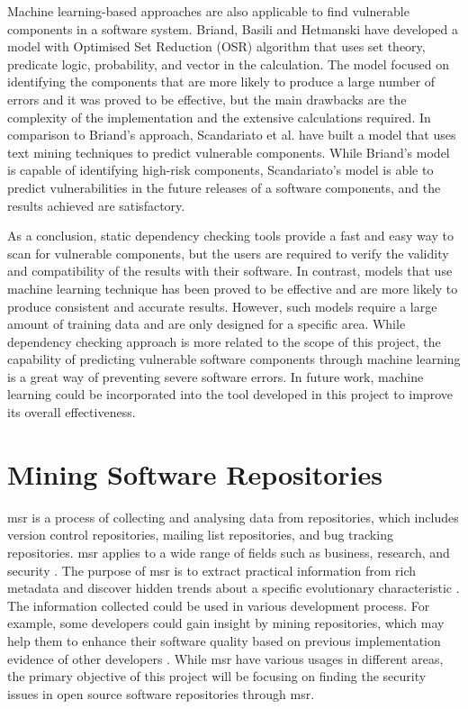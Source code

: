 \documentclass[12pt, a4paper]{report}
\begin{document}
Machine learning-based approaches are also applicable to find vulnerable components in a software
system. Briand, Basili and Hetmanski \cite{briand_1993} have developed a model with Optimised Set
Reduction (OSR) algorithm that uses set theory, predicate logic, probability, and vector in the
calculation. The model focused on identifying the components that are more likely to produce a large
number of errors and it was proved to be effective, but the main drawbacks are the complexity of the
implementation and the extensive calculations required. In comparison to Briand's approach,
Scandariato et al. \cite{scandariato_2014} have built a model that uses text mining techniques to
predict vulnerable components. While Briand's model is capable of identifying high-risk components,
Scandariato's model is able to predict vulnerabilities in the future releases of a software
components, and the results achieved are satisfactory.

As a conclusion, static dependency checking tools provide a fast and easy way to scan for vulnerable
components, but the users are required to verify the validity and compatibility of the results with
their software. In contrast, models that use machine learning technique has been proved to be
effective and are more likely to produce consistent and accurate results. However, such models
require a large amount of training data and are only designed for a specific area. While dependency
checking approach is more related to the scope of this project, the capability of predicting
vulnerable software components through machine learning is a great way of preventing severe software
errors. In future work, machine learning could be incorporated into the tool developed in this
project to improve its overall effectiveness.

\section{Mining Software Repositories} \label{sec:msr}
\acrfull{msr} is a process of collecting and analysing data from repositories, which includes
version control repositories, mailing list repositories, and bug tracking repositories.
\acrshort{msr} applies to a wide range of fields such as business, research, and security
\cite{poncin_2011}. The purpose of \acrshort{msr} is to extract practical information from rich
metadata and discover hidden trends about a specific evolutionary characteristic \cite{kagdi_2007}.
The information collected could be used in various development process. For example, some developers
could gain insight by mining repositories, which may help them to enhance their software quality
based on previous implementation evidence of other developers \cite{hassan_2008}. While
\acrshort{msr} have various usages in different areas, the primary objective of this project will be
focusing on finding the security issues in open source software repositories through \acrshort{msr}.
\end{document}
